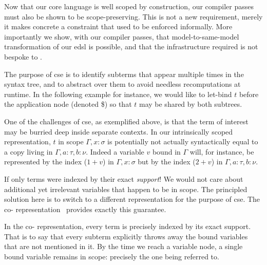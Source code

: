 

Now that our core language is well scoped by construction, our compiler passes
must also be shown to be scope-preserving.
%
This is not a new requirement, merely it makes concrete a constraint that
used to be enforced informally.
More importantly we show, with our compiler passes, that model-to-same-model transformation of our \ac{edsl} is possible, and that the infrastructure required is not bespoke to \Velo{}.

The purpose of \ac{cse} is to identify subterms that appear multiple times in the syntax tree, and to abstract over them to avoid needless recomputations at runtime.
%
In the following example for instance, we would like to let-bind $t$ before
the application node (denoted \$) so that $t$ may be shared by both subtrees.

\begin{center}
  \cseexamplegraph{}
\end{center}

One of the challenges of \ac{cse}, as exemplified above, is that the term of interest
may be burried deep inside separate contexts.
%
In our intrinsically scoped representation, $t$ in scope $\Gamma, x : \sigma$
is potentially not actually syntactically equal to a copy living in $\Gamma, a : \tau, b : \nu$.
%
Indeed a variable $v$ bound in $\Gamma$ will, for instance, be represented by
the \DeBruijn{} index ($1+v$) in $\Gamma, x : \sigma$
but by the index ($2+v$) in $\Gamma, a :  \tau, b : \nu$.

If only terms were indexed by their exact \emph{support}!
We would not care about additional yet irrelevant variables that happen to be in scope.
%
The principled solution here is to switch to a different representation for
the purpose of \ac{cse}.
The co-\DeBruijn{} representation~\cite{DBLP:journals/corr/abs-1807-04085} provides exactly this guarantee.


In the co-\DeBruijn{} representation, every term is precisely indexed by its
exact support.
%
That is to say that every subterm explicitly throws away the bound variables
that are not mentioned in it.
%
By the time we reach a variable node, a single bound variable remains in scope:
precisely the one being referred to.

